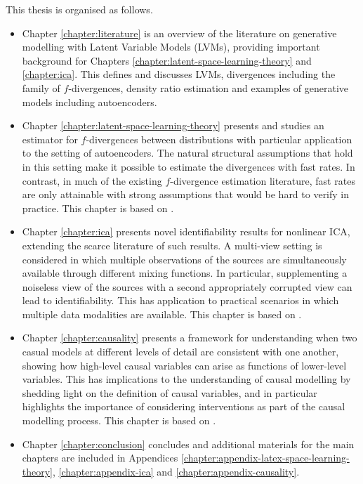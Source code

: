 This thesis is organised as follows.

\begin{itemize}
\item Chapter \ref{chapter:literature} is an overview of the literature on generative modelling with Latent Variable Models (LVMs), providing important background for Chapters \ref{chapter:latent-space-learning-theory} and \ref{chapter:ica}. 
This defines and discusses LVMs, divergences including the family of $f$-divergences, density ratio estimation and examples of generative models including autoencoders.
\item Chapter \ref{chapter:latent-space-learning-theory} presents and studies an estimator for $f$-divergences between distributions with particular application to the setting of autoencoders. 
The natural structural assumptions that hold in this setting make it possible to estimate the divergences with fast rates.
In contrast, in much of the existing $f$-divergence estimation literature, fast rates are only attainable with strong assumptions that would be hard to verify in practice.
This chapter is based on \cite{rubenstein2019practical}.
\item Chapter \ref{chapter:ica} presents novel identifiability results for nonlinear ICA, extending the scarce literature of such results. 
A multi-view setting is considered in which multiple observations of the sources are simultaneously available through different mixing functions.
In particular, supplementing a noiseless view of the sources with a second appropriately corrupted view can lead to identifiability.
This has application to practical scenarios in which multiple data modalities are available.
This chapter is based on \cite{gresele2019incomplete}.
\item Chapter \ref{chapter:causality} presents a framework for understanding when two casual models at different levels of detail are consistent with one another, showing how high-level causal variables can arise as functions of lower-level variables.
This has implications to the understanding of causal modelling by shedding light on the definition of causal variables, and in particular highlights the importance of considering interventions as part of the causal modelling process.
This chapter is based on \cite{rubenstein2017causal}.
\item Chapter \ref{chapter:conclusion} concludes and additional materials for the main chapters are included in Appendices \ref{chapter:appendix-latex-space-learning-theory}, \ref{chapter:appendix-ica} and \ref{chapter:appendix-causality}.
\end{itemize}


